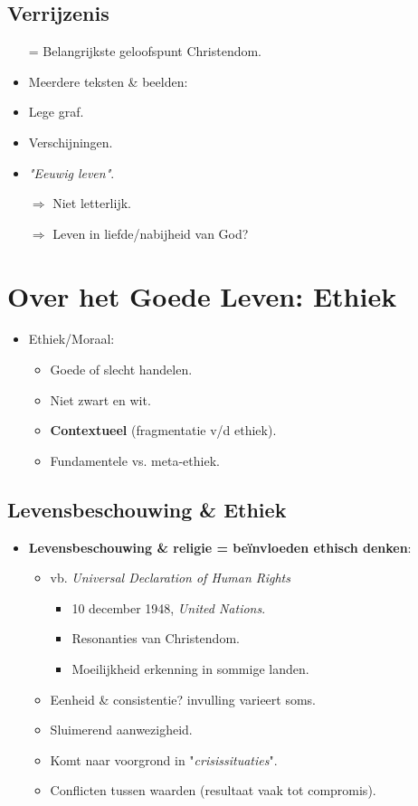 \subsection*{Verrijzenis}
\begin{itemize}
	\item[=] Belangrijkste geloofspunt Christendom.
	\item Meerdere teksten \& beelden:
	\item Lege graf.
	\item Verschijningen.
	\item \textit{"Eeuwig leven"}.
	\item[$\Rightarrow$] Niet letterlijk.
	\item[$\Rightarrow$] Leven in liefde/nabijheid van God?
\end{itemize}

\section{Over het Goede Leven: Ethiek}
\begin{itemize}
	\item Ethiek/Moraal:
	\begin{itemize}
		\item Goede of slecht handelen.
		\item Niet zwart en wit.
		\item \textbf{Contextueel} (fragmentatie v/d ethiek).
		\item Fundamentele vs. meta-ethiek.
	\end{itemize}
\end{itemize}
\subsection*{Levensbeschouwing \& Ethiek}
\begin{itemize}
	\item \textbf{Levensbeschouwing \& religie = beïnvloeden ethisch denken}:
	\begin{itemize}
		\item vb. \textit{Universal Declaration of Human Rights}
		\begin{itemize}
			\item 10 december 1948, \textit{United Nations}.
			\item Resonanties van Christendom.
			\item Moeilijkheid erkenning in sommige landen.
		\end{itemize}
		\item Eenheid \& consistentie? invulling varieert soms.
		\item Sluimerend aanwezigheid.
		\item Komt naar voorgrond in "\textit{crisissituaties}".
		\item Conflicten tussen waarden (resultaat vaak tot compromis).
	\end{itemize}
\end{itemize}
